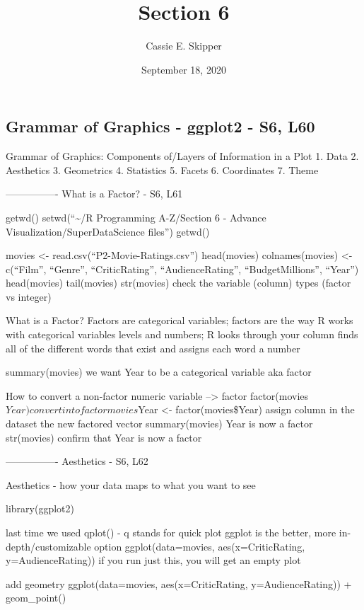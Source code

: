 \documentclass[]{article}
\title{Section 6}
\author{Cassie E. Skipper}
\date{September 18, 2020}
\begin{document}
\maketitle

\subsection{Grammar of Graphics - ggplot2 - S6,
L60}\label{grammar-of-graphics---ggplot2---s6-l60}

Grammar of Graphics: Components of/Layers of Information in a Plot 1.
Data 2. Aesthetics 3. Geometrics 4. Statistics 5. Facets 6. Coordinates
7. Theme

---------------- What is a Factor? - S6, L61

getwd() setwd(``\textasciitilde{}/R Programming A-Z/Section 6 - Advance
Visualization/SuperDataScience files'') getwd()

movies \textless{}- read.csv(``P2-Movie-Ratings.csv'') head(movies)
colnames(movies) \textless{}- c(``Film'', ``Genre'', ``CriticRating'',
``AudienceRating'', ``BudgetMillions'', ``Year'') head(movies)
tail(movies) str(movies) check the variable (column) types (factor vs
integer)

What is a Factor? Factors are categorical variables; factors are the way
R works with categorical variables levels and numbers; R looks through
your column finds all of the different words that exist and assigns each
word a number

summary(movies) we want Year to be a categorical variable aka factor

How to convert a non-factor numeric variable --\textgreater{} factor
factor(movies\(Year) convert into factor movies\)Year \textless{}-
factor(movies\$Year) assign column in the dataset the new factored
vector summary(movies) Year is now a factor str(movies) confirm that
Year is now a factor

---------------- Aesthetics - S6, L62

Aesthetics - how your data maps to what you want to see

library(ggplot2)

last time we used qplot() - q stands for quick plot ggplot is the
better, more in-depth/customizable option ggplot(data=movies,
aes(x=CriticRating, y=AudienceRating)) if you run just this, you will
get an empty plot

add geometry ggplot(data=movies, aes(x=CriticRating, y=AudienceRating))
+ geom\_point()
\end{document}
